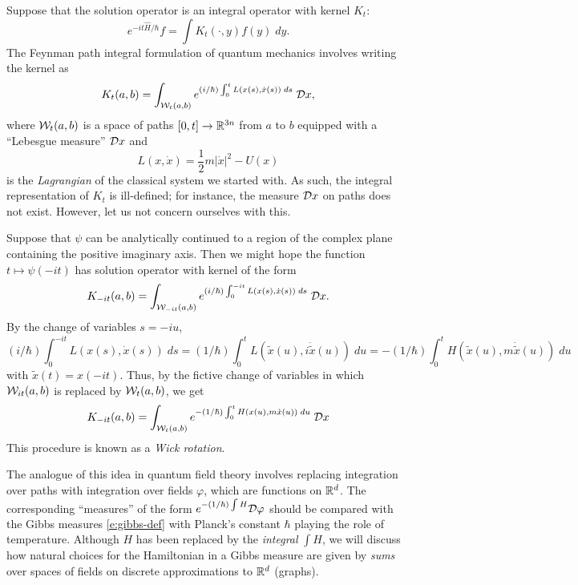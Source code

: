 Suppose that the solution operator is an integral operator with kernel $K_t$:
\begin{equation}
e^{-it\hat H/\hbar} f = \int K_t(\cdot, y) f(y) \; dy.
\end{equation}
The Feynman path integral formulation of quantum mechanics involves writing
the kernel as
\begin{equation}
K_t(a, b)
	=
\int_{\mathcal{W}_t(a, b)} e^{(i/\hbar) \int_0^t L(x(s), \dot x(s)) \; ds} \; \mathcal{D} x,
\end{equation}
where $\mathcal{W}_t(a, b)$ is a space of paths $[0, t] \rightarrow {\mathbb R}^{3n}$ from
$a$ to $b$ equipped with a ``Lebesgue measure'' $\mathcal{D} x$ and
\begin{equation}
L(x, \dot x) = \frac{1}{2} m |\dot x|^2 - U(x)
\end{equation}
is the \emph{Lagrangian} of the classical system we started with.
As such, the integral representation of $K_t$ is ill-defined;
for instance, the measure $\mathcal{D} x$ on paths does not exist. However, let us
not concern ourselves with this.

Suppose that $\psi$ can be analytically continued to a region of the complex
plane containing the positive imaginary axis. Then we might hope the function
$t \mapsto \psi(-it)$ has solution operator with kernel of the form
\begin{equation}
K_{-it}(a, b)
	=
\int_{\mathcal{W}_{-it}(a, b)} e^{(i/\hbar) \int_0^{-it} L(x(s), \dot x(s)) \; ds} \; \mathcal{D} x.
\end{equation}
By the change of variables $s = -iu$,
\begin{equation}
(i/\hbar) \int_0^{-it} L(x(s), \dot x(s)) \; ds
	=
(1/\hbar) \int_0^t L(\tilde x(u), i \dot{\tilde x}(u)) \; du
	=
-(1/\hbar) \int_0^t H(\tilde x(u), m \dot{\tilde x}(u)) \; du
\end{equation}
with $\tilde x(t) = x(-it)$. Thus, by the fictive change of variables in which
$\mathcal{W}_{it}(a, b)$ is replaced by $\mathcal{W}_t(a, b)$, we get
\begin{equation}
\label{e:heat-kernel-fake}
K_{-it}(a, b)
	=
\int_{\mathcal{W}_t(a, b)} e^{-(1/\hbar) \int_0^t H(x(u), m\dot x(u)) \; du} \; \mathcal{D} x
\end{equation}
This procedure is known as a \emph{Wick rotation}.

The analogue of this idea in quantum field theory involves replacing integration
over paths with integration over fields $\varphi$, which are functions on ${ {{\mathbb R}}^d}$.
The corresponding ``measures'' of the form $e^{-(1/\hbar)\int H} \mathcal{D}\varphi$
should be compared with the Gibbs measures \eqref{e:gibbs-def} with Planck's constant
$\hbar$ playing the role of temperature. Although $H$
has been replaced by the \emph{integral} $\int H$, we will discuss how natural
choices for the Hamiltonian in a Gibbs measure are given by \emph{sums} over
spaces of fields on discrete approximations to ${ {{\mathbb R}}^d}$ (graphs).


